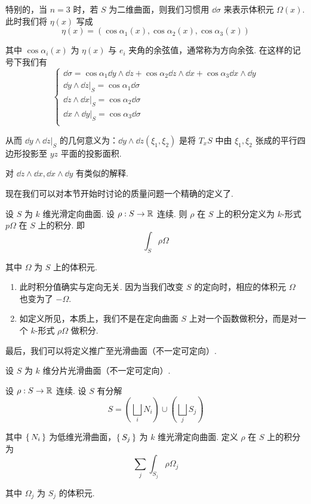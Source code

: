 
特别的，当 $n=3$ 时，若 $S$ 为二维曲面，则我们习惯用 $\dd\sigma$ 来表示体积元 $\Omega(x)$. 此时我们将 $\eta(x)$ 写成
$$
\eta(x)=(\cos\alpha_1(x),\cos\alpha_2(x),\cos\alpha_3(x))
$$

其中 $\cos\alpha_i(x)$ 为 $\eta(x)$ 与 $e_i$ 夹角的余弦值，通常称为方向余弦. 在这样的记号下我们有
$$
\begin{cases}
    \dd\sigma=\cos\alpha_1\dd y\wedge\dd z+\cos\alpha_2\dd z\wedge\dd x+\cos\alpha_3\dd x\wedge\dd y\\
    \dd y\wedge\dd z|_S=\cos\alpha_1\dd\sigma\\
    \dd z\wedge\dd x|_S=\cos\alpha_2\dd\sigma\\
    \dd x\wedge\dd y|_S=\cos\alpha_3\dd\sigma\\
\end{cases}
$$

从而 $\dd y\wedge\dd z|_S$ 的几何意义为：$\dd y\wedge\dd z(\xi_1,\xi_2)$ 是将 $T_xS$ 中由 $\xi_1,\xi_2$ 张成的平行四边形投影至 $yz$ 平面的投影面积.

对 $\dd z\wedge\dd x,\dd x\wedge\dd y$ 有类似的解释.



现在我们可以对本节开始时讨论的质量问题一个精确的定义了.

\begin{definition}
    设 $S$ 为 $k$ 维光滑定向曲面. 设 $\rho:S\to\mathbb{R}$ 连续. 则 $\rho$ 在 $S$ 上的积分定义为 $k$-形式 $p\Omega$ 在 $S$ 上的积分. 即
$$
\int_S\rho\Omega
$$

    其中 $\Omega$ 为 $S$ 上的体积元.
\end{definition}

\begin{hint}
    \begin{enumerate}
        \item 此时积分值确实与定向无关. 因为当我们改变 $S$ 的定向时，相应的体积元 $\Omega$ 也变为了 $-\Omega$.
        
        \item 如定义所见，本质上，我们不是在定向曲面 $S$ 上对一个函数做积分，而是对一个 $k$-形式 $\rho\Omega$ 做积分.
    \end{enumerate}
\end{hint}

最后，我们可以将定义推广至光滑曲面（不一定可定向）.

\begin{definition}
    设 $S$ 为 $k$ 维分片光滑曲面（不一定可定向）.

    设 $\rho:S\to\mathbb{R}$ 连续. 设 $S$ 有分解
$$
S=\left(\bigsqcup_iN_i\right)\cup\left(\bigsqcup_jS_j\right)
$$

    其中 $\set{N_i}$ 为低维光滑曲面，$\set{S_j}$ 为 $k$ 维光滑定向曲面. 定义 $\rho$ 在 $S$ 上的积分为
$$
\sum_j\int_{S_j}\rho\Omega_j
$$

    其中 $\Omega_j$ 为 $S_j$ 的体积元.
\end{definition}

